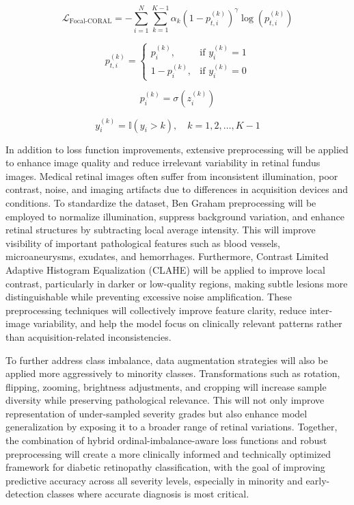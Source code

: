 \[
\mathcal{L}_{\text{Focal-CORAL}} =
- \sum_{i=1}^{N}\sum_{k=1}^{K-1}
\alpha_k (1-p_{t,i}^{(k)})^\gamma \log\left(p_{t,i}^{(k)}\right)
\]

\[
p_{t,i}^{(k)} =
\begin{cases}
p_i^{(k)}, & \text{if } y_i^{(k)} = 1 \\
1 - p_i^{(k)}, & \text{if } y_i^{(k)} = 0
\end{cases}
\]

\[
p_i^{(k)} = \sigma(z_i^{(k)})
\]

\[
y_i^{(k)} = \mathbb{I}(y_i > k), \quad k = 1,2,\dots,K-1
\]

In addition to loss function improvements, extensive preprocessing will be applied to enhance image quality and reduce
irrelevant variability in retinal fundus images. Medical retinal images often suffer from inconsistent illumination,
poor contrast, noise, and imaging artifacts due to differences in acquisition devices and conditions. To standardize
the dataset, Ben Graham preprocessing will be employed to normalize illumination, suppress background variation, and enhance
retinal structures by subtracting local average intensity. This will improve visibility of important pathological
features such as blood vessels, microaneurysms, exudates, and hemorrhages. Furthermore, Contrast Limited Adaptive Histogram
Equalization (CLAHE) will be applied to improve local contrast, particularly in darker or low-quality regions, making subtle
lesions more distinguishable while preventing excessive noise amplification. These preprocessing techniques will collectively
improve feature clarity, reduce inter-image variability, and help the model focus on clinically relevant patterns rather
than acquisition-related inconsistencies.

To further address class imbalance, data augmentation strategies will also be applied more aggressively to minority
classes. Transformations such as rotation, flipping, zooming, brightness adjustments, and cropping will increase sample
diversity while preserving pathological relevance. This will not only improve representation of under-sampled severity
grades but also enhance model generalization by exposing it to a broader range of retinal variations. Together,
the combination of hybrid ordinal-imbalance-aware loss functions and robust preprocessing will create a more clinically
informed and technically optimized framework for diabetic retinopathy classification, with the goal of improving
predictive accuracy across all severity levels, especially in minority and early-detection classes where accurate
diagnosis is most critical.


